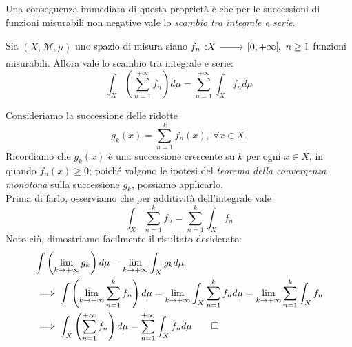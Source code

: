 Una conseguenza immediata di questa proprietà è che per le successioni di funzioni misurabili non negative vale lo \textit{scambio tra integrale e serie}.
\begin{corollary}
Sia $\left(X,\mathcal{M},\mu\right)$ uno spazio di misura siano $\funz{f_n}{X}{\left[0,+\infty\right]},\ n\geq 1$ funzioni misurabili. Allora vale lo scambio tra integrale e serie:
	\begin{equation}
		\int_X\left(\sum_{n=1}^{+\infty}f_n\right)d\mu=\sum_{n=1}^{+\infty}\int_Xf_nd\mu
	\end{equation}
\end{corollary}
\begin{demonstration}
	Consideriamo la successione delle ridotte
	\begin{equation*}
		g_k(x)=\sum_{n=1}^{k}f_n(x),\ \forall x\in X.
	\end{equation*}
	Ricordiamo che $g_k(x)$ è una successione crescente su $k$ per ogni $x\in X$, in quando $f_n(x)\geq 0$; poiché valgono le ipotesi del \textit{teorema della convergenza monotona} sulla successione $g_k$, possiamo applicarlo.\\
	Prima di farlo, osserviamo che per additività dell'integrale vale
	\begin{equation*}
		\int_X \sum_{n=1}^{k}f_n=\sum_{n=1}^{k}\int_X f_n
	\end{equation*}
	Noto ciò, dimostriamo facilmente il risultato desiderato: 
	\begin{align*}
		&\int \left(\lim_{k\to+\infty}g_k\right)d\mu=\lim_{k\to+\infty}\int_X g_kd\mu\\
		&\implies \int \left(\lim_{k\to+\infty}\sum_{n=1}^{k}f_n\right)d\mu=\lim_{k\to+\infty}\int_X \sum_{n=1}^{k}f_nd\mu=\lim_{k\to+\infty}\sum_{n=1}^{k}\int_X f_n\\
		&\implies \int_X\left(\sum_{n=1}^{+\infty}f_n\right)d\mu=\sum_{n=1}^{+\infty}\int_Xf_nd\mu\qedhere
	\end{align*}
\end{demonstration}
